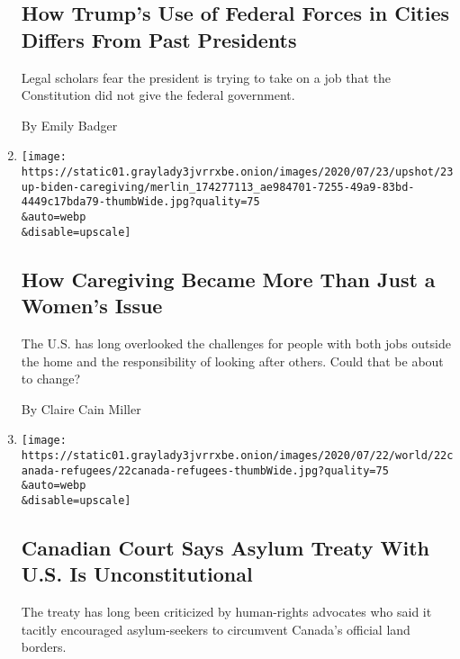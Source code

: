 \begin{enumerate}
  \hypertarget{how-trumps-use-of-federal-forces-in-cities-differs-from-past-presidents}{%
  \subsection{How Trump's Use of Federal Forces in Cities Differs From
  Past
  Presidents}\label{how-trumps-use-of-federal-forces-in-cities-differs-from-past-presidents}}

  Legal scholars fear the president is trying to take on a job that the
  Constitution did not give the federal government.

  By Emily Badger
\item
  \href{/2020/07/23/upshot/biden-caregiving-plan.html}{}

  \texttt{[image: https://static01.graylady3jvrrxbe.onion/images/2020/07/23/upshot/23up-biden-caregiving/merlin\_174277113\_ae984701-7255-49a9-83bd-4449c17bda79-thumbWide.jpg?quality=75\\\&auto=webp\\\&disable=upscale]}

  \hypertarget{how-caregiving-became-more-than-just-a-womens-issue}{%
  \subsection{How Caregiving Became More Than Just a Women's
  Issue}\label{how-caregiving-became-more-than-just-a-womens-issue}}

  The U.S. has long overlooked the challenges for people with both jobs
  outside the home and the responsibility of looking after others. Could
  that be about to change?

  By Claire Cain Miller
\item
  \href{/2020/07/22/world/canada/asylum-Safe-Third-Country-Agreement.html}{}

  \texttt{[image: https://static01.graylady3jvrrxbe.onion/images/2020/07/22/world/22canada-refugees/22canada-refugees-thumbWide.jpg?quality=75\\\&auto=webp\\\&disable=upscale]}

  \hypertarget{canadian-court-says-asylum-treaty-with-us-is-unconstitutional}{%
  \subsection{Canadian Court Says Asylum Treaty With U.S. Is
  Unconstitutional}\label{canadian-court-says-asylum-treaty-with-us-is-unconstitutional}}

  The treaty has long been criticized by human-rights advocates who said
  it tacitly encouraged asylum-seekers to circumvent Canada's official
  land borders.


\end{enumerate}
